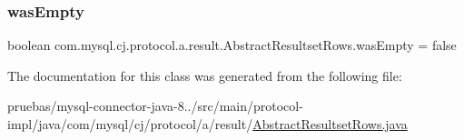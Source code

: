 \subsubsection{\texorpdfstring{was\+Empty}{wasEmpty}}
{\footnotesize\ttfamily boolean com.\+mysql.\+cj.\+protocol.\+a.\+result.\+Abstract\+Resultset\+Rows.\+was\+Empty = false\hspace{0.3cm}{\ttfamily [protected]}}



The documentation for this class was generated from the following file\+:\begin{DoxyCompactItemize}
\item 
pruebas/mysql-\/connector-\/java-\/8../src/main/protocol-\/impl/java/com/mysql/cj/protocol/a/result/\mbox{\hyperlink{_abstract_resultset_rows_8java}{Abstract\+Resultset\+Rows.\+java}}\end{DoxyCompactItemize}
